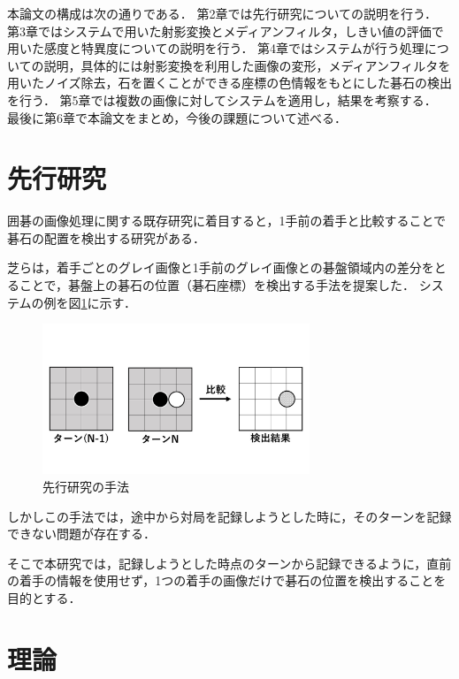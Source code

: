 \documentclass[openright]{nitocs}
\numberwithin{equation}{section}
\begin{document}
        本論文の構成は次の通りである．
        第2章では先行研究についての説明を行う．
        第3章ではシステムで用いた射影変換とメディアンフィルタ，しきい値の評価で用いた感度と特異度についての説明を行う．
        第4章ではシステムが行う処理についての説明，具体的には射影変換を利用した画像の変形，メディアンフィルタを用いたノイズ除去，石を置くことができる座標の色情報をもとにした碁石の検出を行う．
        第5章では複数の画像に対してシステムを適用し，結果を考察する．
        最後に第6章で本論文をまとめ，今後の課題について述べる．

    \section{先行研究} %
        囲碁の画像処理に関する既存研究に着目すると，1手前の着手と比較することで碁石の配置を検出する研究がある．

        芝らは，着手ごとのグレイ画像と1手前のグレイ画像との碁盤領域内の差分をとることで，碁盤上の碁石の位置（碁石座標）を検出する手法を提案した\cite{PilotStudy}．
        システムの例を図\ref{PS_img}に示す．
        \begin{figure}[tb] %
            \begin{center}
            \includegraphics[clip,width=80mm]{PilotStudy_image.jpg} 
            \caption{先行研究の手法}
            \label{PS_img}
            \end{center}
        \end{figure}

        しかしこの手法では，途中から対局を記録しようとした時に，そのターンを記録できない問題が存在する．

        そこで本研究では，記録しようとした時点のターンから記録できるように，直前の着手の情報を使用せず，1つの着手の画像だけで碁石の位置を検出することを目的とする．

    \section{理論} %
    \label{config}
\end{document}
